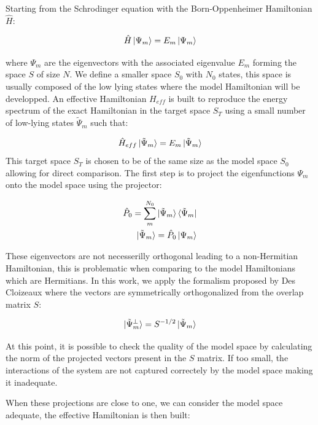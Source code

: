 \documentclass[10pt]{report}
\numberwithin{equation}{section}
\begin{document}
Starting from the Schrodinger equation with the Born-Oppenheimer Hamiltonian $\hat{H}$:

\begin{equation}
    \hat{H}\ket{\Psi_m}=E_m\ket{\Psi_m}
\end{equation}

where $\Psi_m$ are the eigenvectors with the associated eigenvalue $E_m$ forming the space $S$ of size $N$. 
We define a smaller space $S_0$ with $N_0$ states, this space is usually composed of the low lying states where the model Hamiltonian will be developped.
An effective Hamiltonian $H_{eff}$  is built to reproduce the energy spectrum of the exact Hamiltonian in the target space $S_T$ using a small number of low-lying states $\tilde{\Psi}_m$ such that:

\begin{equation}
    \hat{H}_{eff}\ket{\tilde{\Psi}_m}=E_m \ket{\tilde{\Psi}_m}
\end{equation}
This target space $S_T$ is chosen to be of the same size as the model space $S_0$ allowing for direct comparison.
The first step is to project the eigenfunctions $\Psi_m$ onto the model space using the projector:

\begin{align}
    \hat{P}_0=\sum_{m}^{N_0} \ket{\tilde{\Psi}_m} \bra{\tilde{\Psi}_m}\\
    \ket{\tilde{\Psi}_m}=\hat{P}_0 \ket{\Psi_m}
\end{align}

These eigenvectors are not necesserilly orthogonal leading to a non-Hermitian Hamiltonian, this is problematic when comparing to the model Hamiltonians which are Hermitians.
In this work, we apply the formalism proposed by Des Cloizeaux where the vectors are symmetrically orthogonalized from the overlap matrix $S$:

\begin{equation}
    \ket{\tilde{\Psi}_m^\bot}=S^{-1/2} \ket{\tilde{\Psi}_m}
\end{equation}

At this point, it is possible to check the quality of the model space by calculating the norm of the projected vectors present in the $S$ matrix.
If too small, the interactions of the system are not captured correctely by the model space making it inadequate. 
\par When these projections are close to one, we can consider the model space adequate, the effective Hamiltonian is then built:
\end{document}
